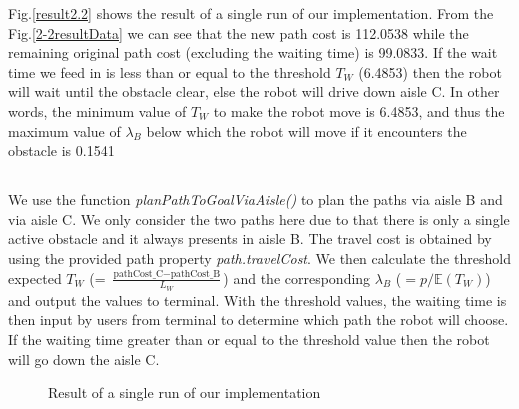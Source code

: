 \documentclass{article}
\begin{document}
Fig.\ref{result2.2} shows the result of a single run of our implementation. From the Fig.\ref{2-2resultData} we can see that the new path cost is 112.0538 while the remaining original path cost (excluding the waiting time) is 99.0833. If the wait time we feed in is less than or equal to the threshold $T_{W}$ (6.4853) then the robot will wait until the obstacle clear, else the robot will drive down aisle C. In other words, the minimum value of $T_{W}$ to make the robot move is 6.4853, and thus the maximum value of $\lambda_{B}$ below which the robot will move if it encounters the obstacle is 0.1541

\subsection{}

We use the function \textit{planPathToGoalViaAisle()} to plan the paths via aisle B and via aisle C. We only consider the two paths here due to that there is only a single active obstacle and it always presents in aisle B. The travel cost is obtained by using the provided path property \textit{path.travelCost}. We then calculate the threshold expected $T_{W}$ (= $\frac{\text{pathCost\_C} - \text{pathCost\_B}}{L_{W}}$) and the corresponding $\lambda_{B}$ ($ = p/ \mathbb{E}(T_{W})$) and output the values to terminal. With the threshold values, the waiting time is then input by users from terminal to determine which path the robot will choose. If the waiting time greater than or equal to the threshold value then the robot will go down the aisle C.

\begin{figure}[H]
\centering  
{}
\caption{Result of a single run of our implementation}
\label{result2.3}
\end{figure}
\end{document}
